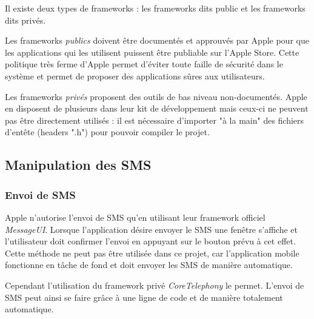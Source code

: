 Il existe deux types de frameworks : les frameworks dits public et les frameworks dits privés.

Les frameworks \textit{publics} doivent être documentés et approuvés par Apple pour que les applications qui les utilisent puissent être publiable sur l'Apple Store.
Cette politique très ferme d'Apple permet d'éviter toute faille de sécurité dans le système et permet de proposer des applications sûres aux utilisateurs.

Les frameworks \textit{privés} proposent des outils de bas niveau non-documentés.
Apple en disposent de plusieurs dans leur kit de développement mais ceux-ci ne peuvent pas être directement utilisés : il est nécessaire d'importer "à la main" des fichiers d'entête (headers ".h") pour pouvoir compiler le projet.
\\




\subsection{Manipulation des SMS}


\subsubsection{Envoi de SMS}

Apple n'autorise l'envoi de SMS qu'en utilisant leur framework officiel \textit{MessageUI}.
Lorsque l'application désire envoyer le SMS une fenêtre s'affiche et l'utilisateur doit confirmer l'envoi en appuyant sur le bouton prévu à cet effet.
Cette méthode ne peut pas être utilisée dans ce projet, car l'application mobile fonctionne en tâche de fond et doit envoyer les SMS de manière automatique.

Cependant l'utilisation du framework privé \textit{CoreTelephony} le permet.
L'envoi de SMS peut ainsi se faire grâce à une ligne de code et de manière totalement automatique.
\\


